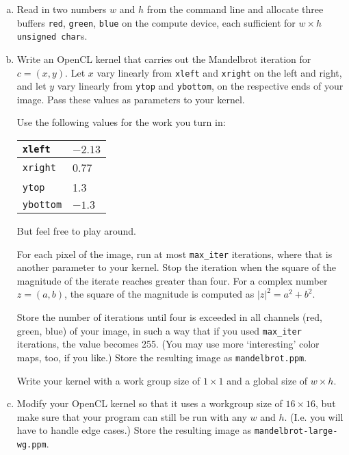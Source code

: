 \documentclass[11pt]{article}
\begin{document}
\begin{enumerate}[a)]
  \item Read in two numbers $w$ and $h$ from the command line and allocate three
    buffers \texttt{red}, \texttt{green}, \texttt{blue} on the compute
    device, each sufficient for $w\times h$ \texttt{unsigned char}s.

  \item Write an OpenCL kernel that carries out the Mandelbrot
    iteration for $c=(x,y)$. Let $x$ vary linearly from
    \texttt{xleft} and \texttt{xright} on the left and right, and
    let $y$ vary linearly from \texttt{ytop} and \texttt{ybottom},
    on the respective ends of your image. Pass these values as
    parameters to your kernel.

    Use the following values for the work you turn in:
    \begin{center}
      \begin{tabular}{|l|l|}
        \hline
        \texttt{xleft} & $-2.13$ \\
        \hline
        \texttt{xright} & 0.77 \\
        \hline
        \texttt{ytop} & 1.3 \\
        \hline
        \texttt{ybottom} & $-1.3$\\
        \hline
      \end{tabular}
    \end{center}
    But feel free to play around.

    For each pixel of the image, run at most \texttt{max\_iter}
    iterations, where that is another parameter to your kernel. Stop
    the iteration when the square of the magnitude of the iterate
    reaches greater than four. For a complex number $z=(a,b)$, the
    square of the magnitude is computed as $|z|^2=a^2+b^2$.

    Store the number of iterations until four is exceeded in all
    channels (red, green, blue) of your image, in such a way that if
    you used \texttt{max\_iter} iterations, the value becomes 255.
    (You may use more `interesting' color maps, too, if you like.)
    Store the resulting image as \texttt{mandelbrot.ppm}.

    Write your kernel with a work group size of $1\times 1$ and a
    global size of $w\times h$.
    \label{part:mbrot-small-wg}

  \item Modify your OpenCL kernel so that it uses a workgroup size of
    $16\times 16$, but make sure that your program can still be run
    with any $w$ and $h$. (I.e. you will have to handle edge cases.)
    Store the resulting image as \texttt{mandelbrot-large-wg.ppm}.
    \label{part:mbrot-large-wg}


\end{enumerate}
\end{document}
